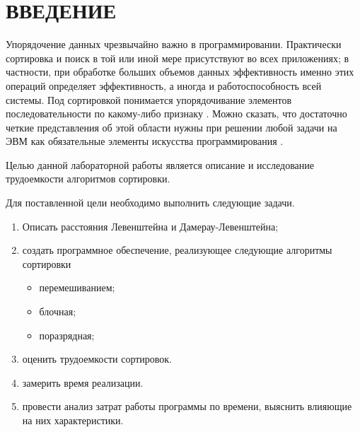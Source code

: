 \chapter*{\hfill{\centering  ВВЕДЕНИЕ}\hfill}


Упорядочение данных чрезвычайно важно в программировании. Практически сортировка и поиск в той или иной
мере присутствуют во всех приложениях; в частности, при обработке больших объемов данных эффективность именно этих операций определяет эффективность, а иногда и работоспособность всей системы.
Под сортировкой понимается упорядочивание элементов последовательности по какому-либо признаку \cite{book_shagbazyan}.
Можно сказать, что достаточно четкие представления об этой области нужны при решении любой задачи на ЭВМ как
обязательные элементы искусства программирования \cite{book_knut}.


Целью данной лабораторной работы является описание и исследование трудоемкости алгоритмов сортировки.

\label{sec:targets}
Для поставленной цели необходимо выполнить следующие задачи.
\begin{enumerate}
	\item Описать расстояния Левенштейна и Дамерау-Левенштейна;
	\item создать программное обеспечение, реализующее следующие алгоритмы сортировки
	\begin{itemize}
		\item перемешиванием;
		\item блочная;
		\item поразрядная;
	\end{itemize}
	\item оценить трудоемкости сортировок.
	\item замерить время реализации.
	\item провести анализ затрат работы программы по времени, выяснить влияющие на них характеристики.
\end{enumerate}




